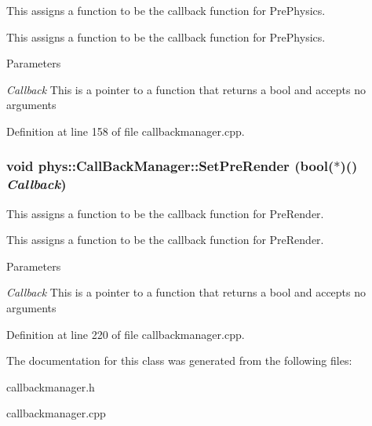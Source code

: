 This assigns a function to be the callback function for PrePhysics. 

This assigns a function to be the callback function for PrePhysics. 
\begin{DoxyParams}{Parameters}
\item[{\em Callback}]This is a pointer to a function that returns a bool and accepts no arguments \end{DoxyParams}


Definition at line 158 of file callbackmanager.cpp.

\hypertarget{classphys_1_1CallBackManager_a1e060fd479413457a798ea3c6b2bcb4d}{
\subsubsection[{SetPreRender}]{\setlength{\rightskip}{0pt plus 5cm}void phys::CallBackManager::SetPreRender (bool($\ast$)() {\em Callback})}}
\label{d1/d47/classphys_1_1CallBackManager_a1e060fd479413457a798ea3c6b2bcb4d}


This assigns a function to be the callback function for PreRender. 

This assigns a function to be the callback function for PreRender. 
\begin{DoxyParams}{Parameters}
\item[{\em Callback}]This is a pointer to a function that returns a bool and accepts no arguments \end{DoxyParams}


Definition at line 220 of file callbackmanager.cpp.



The documentation for this class was generated from the following files:\begin{DoxyCompactItemize}
\item 
callbackmanager.h\item 
callbackmanager.cpp\end{DoxyCompactItemize}

